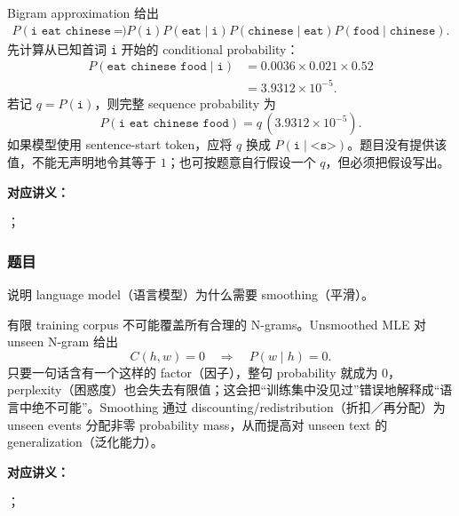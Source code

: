 \begin{checkedsolution}
Bigram approximation 给出
\[
\begin{aligned}
  P(\texttt{i eat chinese food})
  &=P(\texttt{i})P(\texttt{eat}\mid\texttt{i})
    P(\texttt{chinese}\mid\texttt{eat})
    P(\texttt{food}\mid\texttt{chinese}).
\end{aligned}
\]
先计算从已知首词 \texttt{i} 开始的 conditional probability：
\[
\begin{aligned}
  P(\texttt{eat chinese food}\mid\texttt{i})
  &=0.0036\times0.021\times0.52\\
  &=3.9312\times10^{-5}.
\end{aligned}
\]
若记 $q=P(\texttt{i})$，则完整 sequence probability 为
\[
  \boxed{P(\texttt{i eat chinese food})=q\,(3.9312\times10^{-5})}.
\]
如果模型使用 sentence-start token，应将 $q$ 换成 $P(\texttt{i}\mid\texttt{<s>})$。题目没有提供该值，不能无声明地令其等于 $1$；也可按题意自行假设一个 $q$，但必须把假设写出。
\end{checkedsolution}


\textbf{对应讲义：}\par
{}；\par
{}

\subsubsection*{题目}

说明 language model（语言模型）为什么需要 smoothing（平滑）。

\begin{checkedsolution}
有限 training corpus 不可能覆盖所有合理的 N-grams。Unsmoothed MLE 对 unseen N-gram 给出
\[
  C(h,w)=0\quad\Longrightarrow\quad P(w\mid h)=0.
\]
只要一句话含有一个这样的 factor（因子），整句 probability 就成为 $0$，perplexity（困惑度）也会失去有限值；这会把“训练集中没见过”错误地解释成“语言中绝不可能”。Smoothing 通过 discounting/redistribution（折扣／再分配）为 unseen events 分配非零 probability mass，从而提高对 unseen text 的 generalization（泛化能力）。
\end{checkedsolution}


\textbf{对应讲义：}\par
{}；\par
{}

